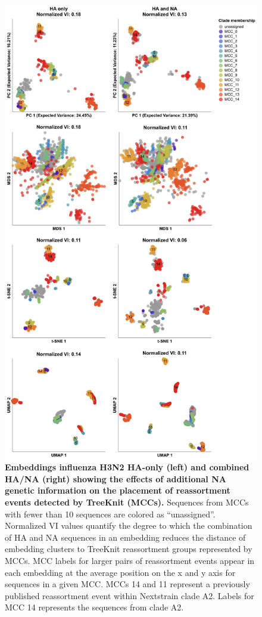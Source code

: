 \begin{figure}[!h]
\includegraphics[width=0.75\columnwidth]{figures/flu-2016-2018-ha-na-all-embeddings-by-mcc.png}
\caption{{\bf Embeddings influenza H3N2 HA-only (left) and combined HA/NA (right) showing the effects of additional NA genetic information on the placement of reassortment events detected by TreeKnit (MCCs).}
  Sequences from MCCs with fewer than 10 sequences are colored as ``unassigned''.
  Normalized VI values quantify the degree to which the combination of HA and NA sequences in an embedding reduces the distance of embedding clusters to TreeKnit reassortment groups represented by MCCs.
  MCC labels for larger pairs of reassortment events appear in each embedding at the average position on the x and y axis for sequences in a given MCC.
  MCCs 14 and 11 represent a previously published reassortment event within Nextstrain clade A2.
  Labels for MCC 14 represents the sequences from clade A2.}\label{S_Fig_full_ha_na_embeddings}
\end{figure}

